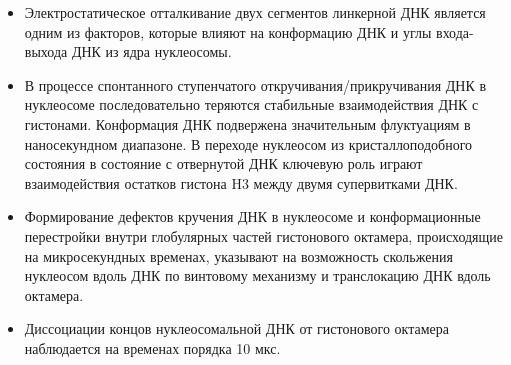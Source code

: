 \begin{itemize}
    \item Электростатическое отталкивание двух сегментов линкерной ДНК является одним из факторов, которые влияют на конформацию ДНК и углы входа-выхода ДНК из ядра нуклеосомы.
    \item В процессе спонтанного ступенчатого откручивания/прикручивания ДНК в нуклеосоме последовательно теряются стабильные взаимодействия ДНК с гистонами. Конформация ДНК подвержена значительным флуктуациям в наносекундном диапазоне. В переходе нуклеосом из кристаллоподобного состояния в состояние с отвернутой ДНК ключевую роль играют взаимодействия остатков гистона H3 между двумя супервитками ДНК.
    \item Формирование дефектов кручения ДНК в нуклеосоме и конформационные перестройки внутри глобулярных частей гистонового октамера, происходящие на микросекундных временах, указывают на возможность скольжения нуклеосом вдоль ДНК по винтовому механизму и транслокацию ДНК вдоль октамера.
    \item Диссоциации концов нуклеосомальной ДНК от гистонового октамера наблюдается на временах порядка 10 мкс. 

\end{itemize}




